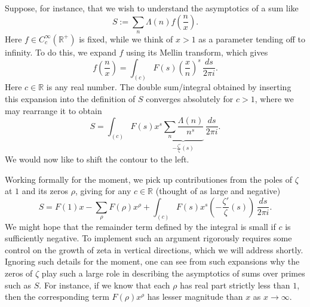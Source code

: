 \documentclass[reqno]{amsart}  \numberwithin{theorem}{section} \numberwithin{equation}{section}
\begin{document}
Suppose, for instance, that we wish to understand the asymptotics of a sum like
\begin{equation*}
S := \sum_n \Lambda (n) f \left( \frac{n}{x} \right).
\end{equation*}
Here $f \in C_c^\infty (\mathbb{R}^+ )$ is fixed, while we think of $x > 1$ as a parameter tending off to infinity.  To do this, we expand $f$ using its Mellin transform, which gives
\begin{equation*}
f \left( \frac{n}{x} \right) = \int_{(c)} F (s) \left( \frac{x}{n} \right)^s \, \frac{d s}{2 \pi i}.
\end{equation*}
Here $c \in \mathbb{R}$ is any real number.  The double sum/integral obtained by inserting this expansion into the definition of $S$ converges absolutely for $c > 1$, where we may rearrange it to obtain
\begin{equation*}
S = \int_{(c)} F (s) x^s \underbrace
{
  \sum_n 
\frac{\Lambda (n)}{ n^s } 
}_{
  - \frac{\zeta ' }{\zeta }(s)
}\, \frac{d s}{2 \pi i}.
\end{equation*}
We would now like to shift the contour to the left.

Working formally for the moment, we pick up contributiones from the poles of $\zeta$ at $1$ and its zeros $\rho$, giving for any $c \in \mathbb{R}$ (thought of as large and negative)
\begin{equation*}
  S =
  F(1) x
  -
  \sum_{\rho}
  F(\rho) x^\rho
  + 
  \int_{(c)} F(s) x^s \left( -\frac{\zeta ' }{\zeta }(s) \right) \, \frac{d s}{2 \pi i}.
\end{equation*}
We might hope that the remainder term defined by the integral is small if $c$ is sufficiently negative.  To implement such an argument rigorously requires some control on the growth of zeta in vertical directions, which we will address shortly.  Ignoring such details for the moment, one can see from such expansions why the zeros of $\zeta$ play such a large role in describing the asymptotics of sums over primes such as $S$.  For instance, if we know that each $\rho$ has real part strictly less than $1$, then the corresponding term $F(\rho) x^\rho$ has lesser magnitude than $x$ as $x \rightarrow \infty$.
\end{document}
